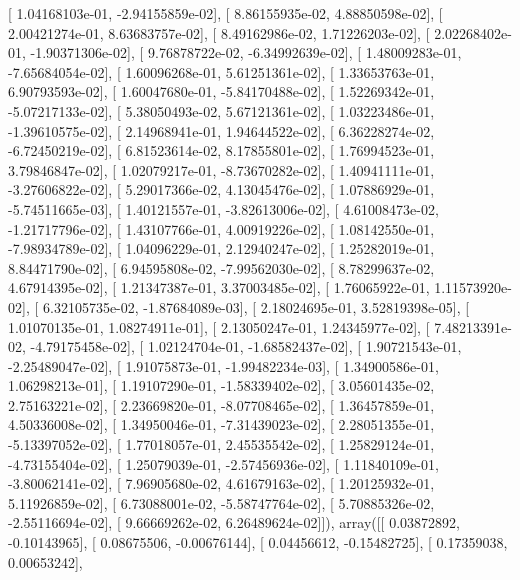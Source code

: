 \documentclass{article}
\begin{document}
       [  1.04168103e-01,  -2.94155859e-02],
       [  8.86155935e-02,   4.88850598e-02],
       [  2.00421274e-01,   8.63683757e-02],
       [  8.49162986e-02,   1.71226203e-02],
       [  2.02268402e-01,  -1.90371306e-02],
       [  9.76878722e-02,  -6.34992639e-02],
       [  1.48009283e-01,  -7.65684054e-02],
       [  1.60096268e-01,   5.61251361e-02],
       [  1.33653763e-01,   6.90793593e-02],
       [  1.60047680e-01,  -5.84170488e-02],
       [  1.52269342e-01,  -5.07217133e-02],
       [  5.38050493e-02,   5.67121361e-02],
       [  1.03223486e-01,  -1.39610575e-02],
       [  2.14968941e-01,   1.94644522e-02],
       [  6.36228274e-02,  -6.72450219e-02],
       [  6.81523614e-02,   8.17855801e-02],
       [  1.76994523e-01,   3.79846847e-02],
       [  1.02079217e-01,  -8.73670282e-02],
       [  1.40941111e-01,  -3.27606822e-02],
       [  5.29017366e-02,   4.13045476e-02],
       [  1.07886929e-01,  -5.74511665e-03],
       [  1.40121557e-01,  -3.82613006e-02],
       [  4.61008473e-02,  -1.21717796e-02],
       [  1.43107766e-01,   4.00919226e-02],
       [  1.08142550e-01,  -7.98934789e-02],
       [  1.04096229e-01,   2.12940247e-02],
       [  1.25282019e-01,   8.84471790e-02],
       [  6.94595808e-02,  -7.99562030e-02],
       [  8.78299637e-02,   4.67914395e-02],
       [  1.21347387e-01,   3.37003485e-02],
       [  1.76065922e-01,   1.11573920e-02],
       [  6.32105735e-02,  -1.87684089e-03],
       [  2.18024695e-01,   3.52819398e-05],
       [  1.01070135e-01,   1.08274911e-01],
       [  2.13050247e-01,   1.24345977e-02],
       [  7.48213391e-02,  -4.79175458e-02],
       [  1.02124704e-01,  -1.68582437e-02],
       [  1.90721543e-01,  -2.25489047e-02],
       [  1.91075873e-01,  -1.99482234e-03],
       [  1.34900586e-01,   1.06298213e-01],
       [  1.19107290e-01,  -1.58339402e-02],
       [  3.05601435e-02,   2.75163221e-02],
       [  2.23669820e-01,  -8.07708465e-02],
       [  1.36457859e-01,   4.50336008e-02],
       [  1.34950046e-01,  -7.31439023e-02],
       [  2.28051355e-01,  -5.13397052e-02],
       [  1.77018057e-01,   2.45535542e-02],
       [  1.25829124e-01,  -4.73155404e-02],
       [  1.25079039e-01,  -2.57456936e-02],
       [  1.11840109e-01,  -3.80062141e-02],
       [  7.96905680e-02,   4.61679163e-02],
       [  1.20125932e-01,   5.11926859e-02],
       [  6.73088001e-02,  -5.58747764e-02],
       [  5.70885326e-02,  -2.55116694e-02],
       [  9.66669262e-02,   6.26489624e-02]]), array([[ 0.03872892, -0.10143965],
       [ 0.08675506, -0.00676144],
       [ 0.04456612, -0.15482725],
       [ 0.17359038,  0.00653242],
\end{document}
